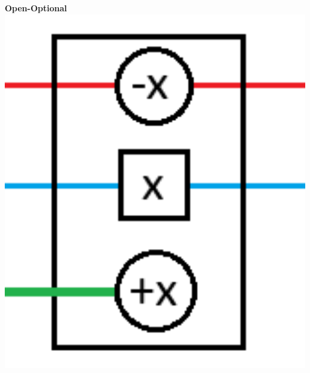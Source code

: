 \documentclass{beamer}
\begin{document}
\begin{frame}
\begin{minipage}[t]{0.32\textwidth}
  \end{minipage}
  \begin{minipage}[t]{0.32\textwidth}
    \textbf{Open-Optional}
    \includegraphics[width=1\textwidth]{res/DoorOpenOptional.png}
  \end{minipage}

\end{frame}
\end{document}
